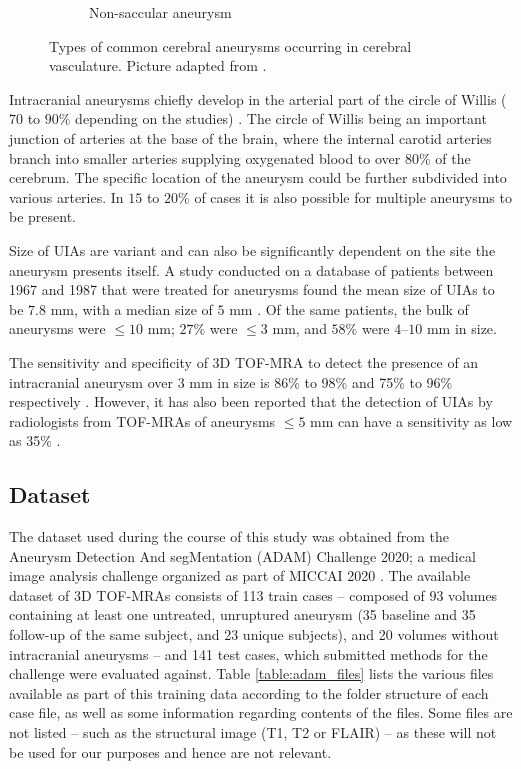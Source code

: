 \begin{figure}[h]
\begin{subfigure}{.45\linewidth}
		\caption[Non-saccular aneurysm]{Non-saccular aneurysm}
	\end{subfigure}
	\caption[Types of aneurysms.]{Types of common cerebral aneurysms occurring in cerebral vasculature. Picture adapted from \citeauthor{Withers2013}.}
	\label{fig:aneurysms.png}
\end{figure}

Intracranial aneurysms chiefly develop in the arterial part of the circle of Willis ($70$ to $90\%$ depending on the studies) \cite{Rodriguez-Regent2014}. The circle of Willis being an important junction of arteries at the base of the brain, where the internal carotid arteries branch into smaller arteries supplying oxygenated blood to over $80\%$ of the cerebrum. The specific location of the aneurysm could be further subdivided into various arteries. In $15$ to $20\%$ of cases it is also possible for multiple aneurysms to be present.

Size of UIAs are variant and can also be significantly dependent on the site the aneurysm presents itself. A study conducted on a database of patients between 1967 and 1987 that were treated for aneurysms found the mean size of UIAs to be $7.8$ mm, with a median size of $5$ mm \cite{Weir2002}. Of the same patients, the bulk of aneurysms were $\leq 10$ mm; $27\%$ were $\leq 3$ mm, and $58\%$ were $4$--$10$ mm in size.

The sensitivity and specificity of 3D TOF-MRA to detect the presence of an intracranial aneurysm over 3 mm in size is 86\% to 98\% and 75\% to 96\% respectively \cite{Sailer2014}. However, it has also been reported that the detection of UIAs by radiologists from TOF-MRAs of aneurysms $\leq 5$ mm can have a sensitivity as low as 35\% \cite{White2001}.

\subsection{Dataset}
The dataset used during the course of this study was obtained from the Aneurysm Detection And segMentation (ADAM) Challenge 2020; a medical image analysis challenge organized as part of MICCAI 2020 \cite{Timmins2020}. The available dataset of 3D TOF-MRAs consists of 113 train cases -- composed of 93 volumes containing at least one untreated, unruptured aneurysm (35 baseline and 35 follow-up of the same subject, and 23 unique subjects), and 20 volumes without intracranial aneurysms -- and 141 test cases, which submitted methods for the challenge were evaluated against. Table \ref{table:adam_files} lists the various files available as part of this training data according to the folder structure of each case file, as well as some information regarding contents of the files. Some files are not listed -- such as the structural image (T1, T2 or FLAIR) -- as these will not be used for our purposes and hence are not relevant.

